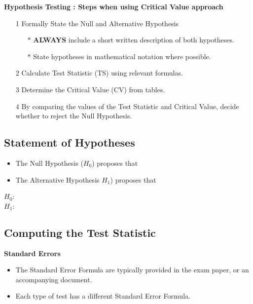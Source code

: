 \documentclass[a4paper,12pt]{article}
\begin{document}
\begin{framed}
		\noindent \textbf{Hypothesis Testing : Steps when using Critical Value approach}
		
		\begin{itemize}
			\item[1] Formally State the Null and Alternative Hypothesis \smallskip
			{
				\begin{itemize}
					\item[$\ast$] \textbf{ALWAYS} include a short written description of both hypotheses.
					\item[$\ast$] State hypotheses in mathematical notation where possible.
					
				\end{itemize}
			}
			\item[2] Calculate Test Statistic (TS) using relevant formulas.\smallskip
			\item[3] Determine the Critical Value (CV) from tables. \smallskip
			\item[4] By comparing the values of the Test Statistic and Critical Value, decide whether to reject the Null Hypothesis.
		\end{itemize}
	\end{framed}

\subsection*{Statement of Hypotheses}

\begin{itemize}
    \item The Null Hypothesis ($H_0$) proposes that
    \item The Alternative Hypothesis $H_1$) proposes that
\end{itemize}
\begin{description}
\item[$H_0$:]
\item[$H_1$:]
\end{description}

\newpage
\subsection*{Computing the Test Statistic}

\noindent \textbf{Standard Errors}
\begin{itemize}
    \item The Standard Error Formula are typically provided in the exam paper, or an accompanying document.
    \item Each type of test has a different Standard Error Formula.
\end{itemize}
\bigslip
\end{document}
